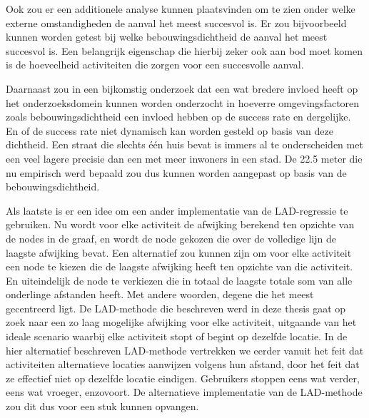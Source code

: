 Ook zou er een additionele analyse kunnen plaatsvinden om te zien onder welke
externe omstandigheden de aanval het meest succesvol is. Er zou bijvoorbeeld
kunnen worden getest bij welke bebouwingsdichtheid de aanval het meest
succesvol is. Een belangrijk eigenschap die hierbij zeker ook aan bod moet
komen is de hoeveelheid activiteiten die zorgen voor een succesvolle aanval.

Daarnaast zou in een bijkomstig onderzoek dat een wat bredere invloed heeft op
het onderzoeksdomein kunnen worden onderzocht in hoeverre omgevingsfactoren
zoals bebouwingsdichtheid een invloed hebben op de success rate en dergelijke.
En of de success rate niet dynamisch kan worden gesteld op basis van deze
dichtheid. Een straat die slechts één huis bevat is immers al te onderscheiden
met een veel lagere precisie dan een met meer inwoners in een stad. De 22.5
meter die nu empirisch werd bepaald zou dus kunnen worden aangepast op basis
van de bebouwingsdichtheid.

Als laatste is er een idee om een ander implementatie van de \ac{LAD}-regressie
te gebruiken. Nu wordt voor elke activiteit de afwijking berekend ten opzichte
van de nodes in de graaf, en wordt de node gekozen die over de volledige lijn
de laagste afwijking bevat. Een alternatief zou kunnen zijn om voor elke
activiteit een node te kiezen die de laagste afwijking heeft ten opzichte van
die activiteit. En uiteindelijk de node te verkiezen die in totaal de laagste
totale som van alle onderlinge afstanden heeft. Met andere woorden, degene die
het meest gecentreerd ligt. De \ac{LAD}-methode die beschreven werd in deze
thesis gaat op zoek naar een zo laag mogelijke afwijking voor elke activiteit,
uitgaande van het ideale scenario waarbij elke activiteit stopt of begint op
dezelfde locatie. In de hier alternatief beschreven \ac{LAD}-methode vertrekken
we eerder vanuit het feit dat activiteiten alternatieve locaties aanwijzen
volgens hun afstand, door het feit dat ze effectief niet op dezelfde locatie
eindigen. Gebruikers stoppen eens wat verder, eens wat vroeger, enzovoort. De
alternatieve implementatie van de \ac{LAD}-methode zou dit dus voor een stuk
kunnen opvangen.



